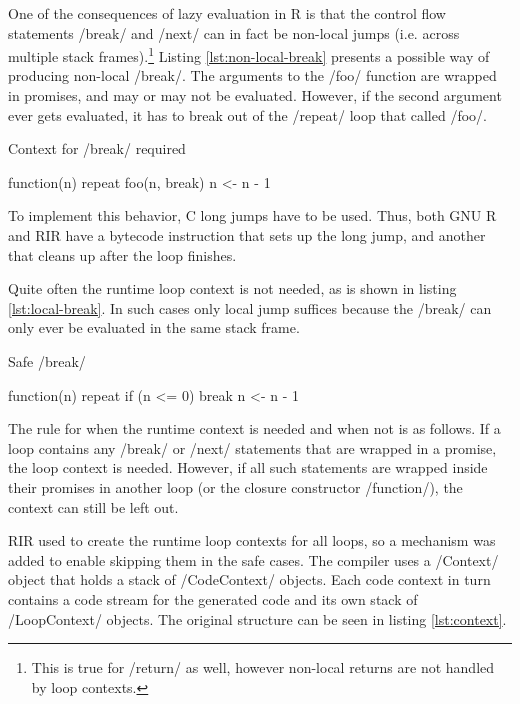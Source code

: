 One of the consequences of lazy evaluation in R is that the control flow statements \rinline/break/ and \rinline/next/ can in fact be non-local jumps (i.e. across multiple stack frames).\footnote{This is true for \rinline/return/ as well, however non-local returns are not handled by loop contexts.} Listing \ref{lst:non-local-break} presents a possible way of producing non-local \rinline/break/. The arguments to the \rinline/foo/ function are wrapped in promises, and may or may not be evaluated. However, if the second argument ever gets evaluated, it has to break out of the \rinline/repeat/ loop that called \rinline/foo/.

\begin{listing}[htbp]
  \caption{\label{lst:non-local-break}Context for \rinline/break/ required}
  \begin{rcode}
function(n) {
    repeat {
        foo(n, break)
        n <- n - 1
    }
}
  \end{rcode}
\end{listing}

To implement this behavior, C long jumps have to be used. Thus, both GNU R and RIR have a bytecode instruction that sets up the long jump, and another that cleans up after the loop finishes.

Quite often the runtime loop context is not needed, as is shown in listing \ref{lst:local-break}. In such cases only local jump suffices because the \rinline/break/ can only ever be evaluated in the same stack frame.

\begin{listing}[htbp]
  \caption{\label{lst:local-break}Safe \rinline/break/}
  \begin{rcode}
function(n) {
    repeat {
        if (n <= 0) break
        n <- n - 1
    }
}
  \end{rcode}
\end{listing}

The rule for when the runtime context is needed and when not is as follows. If a loop contains any \rinline/break/ or \rinline/next/ statements that are wrapped in a promise, the loop context is needed. However, if all such statements are wrapped inside their promises in another loop (or the closure constructor \rinline/function/), the context can still be left out.

RIR used to create the runtime loop contexts for all loops, so a mechanism was added to enable skipping them in the safe cases. The compiler uses a \cppinline/Context/ object that holds a stack of \cppinline/CodeContext/ objects. Each code context in turn contains a code stream for the generated code and its own stack of \cppinline/LoopContext/ objects. The original structure can be seen in listing \ref{lst:context}.

